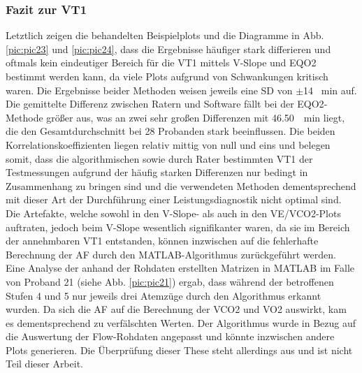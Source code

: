 \subsubsection{Fazit zur VT1}
%
Letztlich zeigen die behandelten Beispielplots und die Diagramme in Abb. \ref{pic:pic23} und \ref{pic:pic24}, dass die Ergebnisse häufiger stark differieren und oftmals kein eindeutiger Bereich für die VT1 mittels V-Slope und \acs{EQO2} bestimmt werden kann, da viele Plots aufgrund von Schwankungen kritisch waren. Die Ergebnisse beider Methoden weisen jeweils eine \acs{SD} von $\pm$14 \si{\per\minute} auf. Die gemittelte Differenz zwischen Ratern und Software fällt bei der \acs{EQO2}-Methode größer aus, was an zwei sehr großen Differenzen mit \SIlist{46,50}{\per\minute} liegt, die den Gesamtdurchschnitt bei 28 Probanden stark beeinflussen. Die beiden Korrelationskoeffizienten liegen relativ mittig von null und eins und belegen somit, dass die algorithmischen sowie durch Rater bestimmten VT1 der Testmessungen aufgrund der häufig starken Differenzen nur bedingt in Zusammenhang zu bringen sind und die verwendeten Methoden dementsprechend mit dieser Art der Durchführung einer Leistungsdiagnostik nicht optimal sind.\\
Die Artefakte, welche sowohl in den V-Slope- als auch in den \acs{VE}/\acs{VCO2}-Plots auftraten, jedoch beim V-Slope wesentlich signifikanter waren, da sie im Bereich der annehmbaren VT1 entstanden, können inzwischen auf die fehlerhafte Berechnung der \acs{AF} durch den MATLAB-Algorithmus zurückgeführt werden. Eine Analyse der anhand der Rohdaten erstellten Matrizen in MATLAB im Falle von Proband 21 (siehe Abb. \ref{pic:pic21}) ergab, dass während der betroffenen Stufen 4 und 5 nur jeweils drei Atemzüge durch den Algorithmus erkannt wurden. Da sich die \acs{AF} auf die Berechnung der \acs{VCO2} und \acs{VO2} auswirkt, kam es dementsprechend zu verfälschten Werten. Der Algorithmus wurde in Bezug auf die Auswertung der Flow-Rohdaten angepasst und könnte inzwischen andere Plots generieren. Die Überprüfung dieser These steht allerdings aus und ist nicht Teil dieser Arbeit.
%
